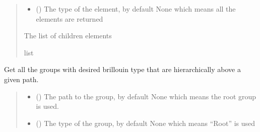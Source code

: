 \documentclass[letterpaper,10pt,english]{sphinxmanual}
\begin{document}
\begin{fulllineitems}
\begin{fulllineitems}
\begin{quote}
\begin{description}
\begin{itemize}
\item {} 
\sphinxAtStartPar
{} (\sphinxstyleliteralemphasis{\sphinxupquote{, }}) \textendash{} The type of the element, by default None which means all the elements are returned

\end{itemize}

\sphinxAtStartPar
The list of children elements

\sphinxAtStartPar
list

\end{description}\end{quote}

\end{fulllineitems}


\begin{fulllineitems}
\label{\detokenize{source/HDF5_BLS:HDF5_BLS.wrapper.Wrapper.get_special_groups_hierarchy}}
\pysigstartsignatures
\pysiglinewithargsret
{}
{\sphinxparamcomma {}}
{}
\pysigstopsignatures
\sphinxAtStartPar
Get all the groups with desired brillouin type that are hierarchically above a given path.
\begin{quote}\begin{description}
\begin{itemize}
\item {} 
\sphinxAtStartPar
{} (\sphinxstyleliteralemphasis{\sphinxupquote{, }}) \textendash{} The path to the group, by default None which means the root group is used.

\item {} 
\sphinxAtStartPar
{} (\sphinxstyleliteralemphasis{\sphinxupquote{, }}) \textendash{} The type of the group, by default None which means “Root” is used


\end{itemize}
\end{description}
\end{quote}
\end{fulllineitems}
\end{fulllineitems}
\end{document}
